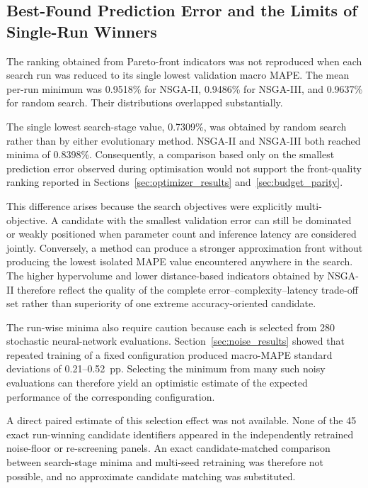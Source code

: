\documentclass[a4paper,fleqn]{cas-sc}
\begin{document}

\subsection{Best-Found Prediction Error and the Limits of Single-Run Winners}
\label{sec:best_found_error}

The ranking obtained from Pareto-front indicators was not reproduced when each search run was reduced to its single lowest validation macro MAPE. The mean per-run minimum was 0.9518\% for NSGA-II, 0.9486\% for NSGA-III, and 0.9637\% for random search. Their distributions overlapped substantially.


The single lowest search-stage value, 0.7309\%, was obtained by random search rather than by either evolutionary method. NSGA-II and NSGA-III both reached minima of 0.8398\%. Consequently, a comparison based only on the smallest prediction error observed during optimisation would not support the front-quality ranking reported in Sections~\ref{sec:optimizer_results} and~\ref{sec:budget_parity}.

This difference arises because the search objectives were explicitly multi-objective. A candidate with the smallest validation error can still be dominated or weakly positioned when parameter count and inference latency are considered jointly. Conversely, a method can produce a stronger approximation front without producing the lowest isolated MAPE value encountered anywhere in the search. The higher hypervolume and lower distance-based indicators obtained by NSGA-II therefore reflect the quality of the complete error--complexity--latency trade-off set rather than superiority of one extreme accuracy-oriented candidate.

The run-wise minima also require caution because each is selected from 280 stochastic neural-network evaluations. Section~\ref{sec:noise_results} showed that repeated training of a fixed configuration produced macro-MAPE standard deviations of 0.21--0.52~pp. Selecting the minimum from many such noisy evaluations can therefore yield an optimistic estimate of the expected performance of the corresponding configuration.

A direct paired estimate of this selection effect was not available. None of the 45 exact run-winning candidate identifiers appeared in the independently retrained noise-floor or re-screening panels. An exact candidate-matched comparison between search-stage minima and multi-seed retraining was therefore not possible, and no approximate candidate matching was substituted.
\end{document}
